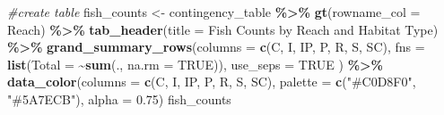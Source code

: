 \documentclass[
]{article}
\newenvironment{Shaded}{\begin{snugshade}}{\end{snugshade}}
\newcommand{\AttributeTok}[1]{\textcolor[rgb]{0.13,0.29,0.53}{#1}}
\newcommand{\CommentTok}[1]{\textcolor[rgb]{0.56,0.35,0.01}{\textit{#1}}}
\newcommand{\ConstantTok}[1]{\textcolor[rgb]{0.56,0.35,0.01}{#1}}
\newcommand{\FloatTok}[1]{\textcolor[rgb]{0.00,0.00,0.81}{#1}}
\newcommand{\FunctionTok}[1]{\textcolor[rgb]{0.13,0.29,0.53}{\textbf{#1}}}
\newcommand{\NormalTok}[1]{#1}
\newcommand{\OtherTok}[1]{\textcolor[rgb]{0.56,0.35,0.01}{#1}}
\newcommand{\SpecialCharTok}[1]{\textcolor[rgb]{0.81,0.36,0.00}{\textbf{#1}}}
\newcommand{\StringTok}[1]{\textcolor[rgb]{0.31,0.60,0.02}{#1}}
\begin{document}
\begin{Shaded}
\begin{Highlighting}[]
\CommentTok{\#create table}
\NormalTok{fish\_counts }\OtherTok{\textless{}{-}}\NormalTok{ contingency\_table }\SpecialCharTok{\%\textgreater{}\%}
  \FunctionTok{gt}\NormalTok{(}\AttributeTok{rowname\_col =} \StringTok{\textquotesingle{}Reach\textquotesingle{}}\NormalTok{) }\SpecialCharTok{\%\textgreater{}\%}
  \FunctionTok{tab\_header}\NormalTok{(}\AttributeTok{title =} \StringTok{\textquotesingle{}Fish Counts by Reach and Habitat Type\textquotesingle{}}\NormalTok{) }\SpecialCharTok{\%\textgreater{}\%}
  \FunctionTok{grand\_summary\_rows}\NormalTok{(}\AttributeTok{columns =} \FunctionTok{c}\NormalTok{(C, I, IP, P, R, S, SC),}
    \AttributeTok{fns =} \FunctionTok{list}\NormalTok{(}\AttributeTok{Total =} \SpecialCharTok{\textasciitilde{}}\FunctionTok{sum}\NormalTok{(., }\AttributeTok{na.rm =} \ConstantTok{TRUE}\NormalTok{)),}
    \AttributeTok{use\_seps =} \ConstantTok{TRUE} 
\NormalTok{    ) }\SpecialCharTok{\%\textgreater{}\%}
    \FunctionTok{data\_color}\NormalTok{(}\AttributeTok{columns =} \FunctionTok{c}\NormalTok{(C, I, IP, P, R, S, SC),}
    \AttributeTok{palette =} \FunctionTok{c}\NormalTok{(}\StringTok{"\#C0D8F0"}\NormalTok{, }\StringTok{"\#5A7ECB"}\NormalTok{), }
    \AttributeTok{alpha =} \FloatTok{0.75}\NormalTok{)}
\NormalTok{fish\_counts}
\end{Highlighting}
\end{Shaded}
\end{document}
